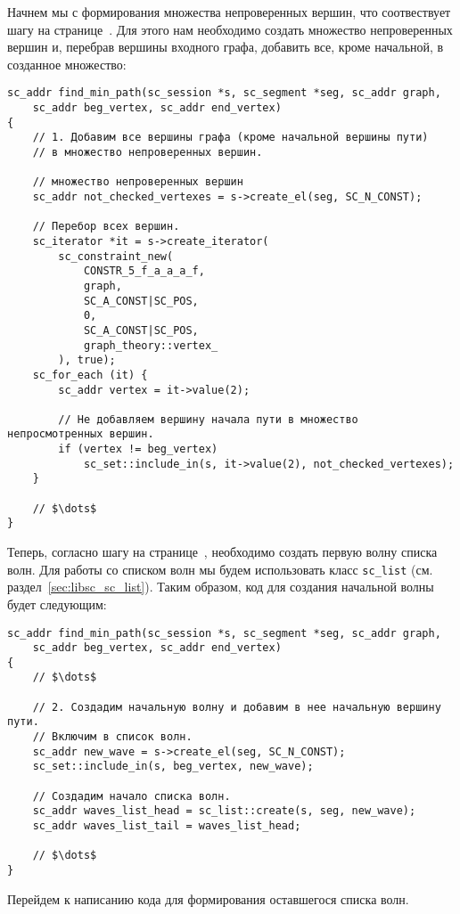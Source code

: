 Начнем мы с формирования множества непроверенных вершин, что
соотвествует шагу на
странице~\pageref{astep:S2_Create_unchecked_vertexes_set}. Для этого
нам необходимо создать множество непроверенных вершин и, перебрав
вершины входного графа, добавить все, кроме начальной, в созданное
множество:
\begin{lstlisting}[texcl]
sc_addr find_min_path(sc_session *s, sc_segment *seg, sc_addr graph,
    sc_addr beg_vertex, sc_addr end_vertex)
{
    // 1. Добавим все вершины графа (кроме начальной вершины пути)
    // в множество непроверенных вершин.

    // множество непроверенных вершин
    sc_addr not_checked_vertexes = s->create_el(seg, SC_N_CONST);

    // Перебор всех вершин.
    sc_iterator *it = s->create_iterator(
        sc_constraint_new(
            CONSTR_5_f_a_a_a_f,
            graph,
            SC_A_CONST|SC_POS,
            0,
            SC_A_CONST|SC_POS,
            graph_theory::vertex_
        ), true);
    sc_for_each (it) {
        sc_addr vertex = it->value(2);

        // Не добавляем вершину начала пути в множество непросмотренных вершин.
        if (vertex != beg_vertex)
            sc_set::include_in(s, it->value(2), not_checked_vertexes);
    }

    // $\dots$
}
\end{lstlisting}

Теперь, согласно шагу на странице~\pageref{astep:S3_Create_1st_wave},
необходимо создать первую волну списка волн. Для работы со списком
волн мы будем использовать класс \lstinline|sc_list|
(см. раздел~\ref{sec:libsc_sc_list}). Таким образом, код для создания
начальной волны будет следующим:
\begin{lstlisting}[texcl]
sc_addr find_min_path(sc_session *s, sc_segment *seg, sc_addr graph,
    sc_addr beg_vertex, sc_addr end_vertex)
{
    // $\dots$

    // 2. Создадим начальную волну и добавим в нее начальную вершину пути.
    // Включим в список волн.
    sc_addr new_wave = s->create_el(seg, SC_N_CONST);
    sc_set::include_in(s, beg_vertex, new_wave);

    // Создадим начало списка волн.
    sc_addr waves_list_head = sc_list::create(s, seg, new_wave);
    sc_addr waves_list_tail = waves_list_head;

    // $\dots$
}
\end{lstlisting}

Перейдем к написанию кода для формирования оставшегося списка волн.

